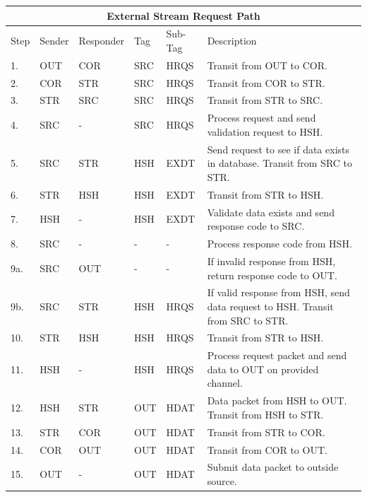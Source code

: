 \documentclass{article}
\begin{document}
\begin{flushleft}
\begin{center}
\begin{tabular}{ | p{1cm} || p{2cm} | p{2cm} | p{2cm} | p{2cm} | p{6cm} | }
\hline
\multicolumn{6}{|c|}{External Stream Request Path}\\
\hline
Step & Sender & Responder & Tag & Sub-Tag & Description\\
1. & OUT & COR & SRC & HRQS & Transit from OUT to COR.\\
2. & COR & STR & SRC & HRQS & Transit from COR to STR.\\
3. & STR & SRC & SRC & HRQS & Transit from STR to SRC.\\
4. & SRC &  -  & SRC & HRQS & Process request and send validation request to HSH.\\
5. & SRC & STR & HSH & EXDT & Send request to see if data exists in database. Transit from SRC to STR.\\
6. & STR & HSH & HSH & EXDT & Transit from STR to HSH.\\
7. & HSH &  -  & HSH & EXDT & Validate data exists and send response code to SRC.\\
8. & SRC &  -  &  -  &  -   & Process response code from HSH.\\
9a. & SRC & OUT &  -  &  -   & If invalid response from HSH, return response code to OUT.\\
9b. & SRC & STR & HSH & HRQS & If valid response from HSH, send data request to HSH. Transit from SRC to STR.\\
10. & STR & HSH & HSH & HRQS & Transit from STR to HSH.\\
11. & HSH &  -  &  HSH & HRQS & Process request packet and send data to OUT on provided channel.\\
12. & HSH & STR & OUT & HDAT & Data packet from HSH to OUT. Transit from HSH to STR.\\
13. & STR & COR & OUT & HDAT & Transit from STR to COR.\\
14. & COR & OUT & OUT & HDAT & Transit from COR to OUT.\\
15. & OUT &  -  & OUT & HDAT & Submit data packet to outside source.\\

\hline
\end{tabular}
\end{center}
\end{flushleft}
\end{document}
